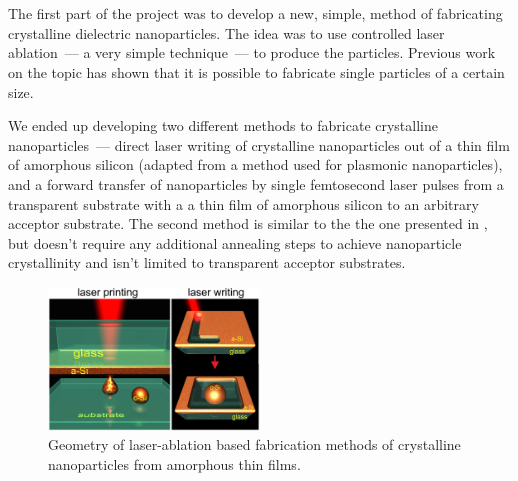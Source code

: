 \section{}
\label{sec:Ablation}
        The first part of the project was to develop a new, simple, method of fabricating crystalline dielectric
    nanoparticles. The idea was to use controlled laser ablation~--- a very simple technique~--- to produce the particles.
    Previous work on the topic\cite{kuznetsov2012magnetic, zywietz2014laser} has shown that it is possible to fabricate single particles
    of a certain size.

        We ended up developing two different methods to fabricate crystalline nanoparticles~--- direct laser writing of crystalline
    nanoparticles out of a thin film of amorphous silicon (adapted from a method used for plasmonic nanoparticles\cite{makarov2016controllable,
    dmitriev2016direct}), and a forward transfer of nanoparticles by single femtosecond laser pulses
    from a transparent substrate with a a thin film of amorphous silicon to an arbitrary acceptor substrate. The second method is
    similar to the the one presented in \cite{zywietz2014laser}, but doesn't require any additional annealing steps to achieve
    nanoparticle crystallinity and isn't limited to transparent acceptor substrates.

    \begin{figure}[h!]
            \begin{center}
                \includegraphics[width=0.5\textwidth]{figs/methods/LaserPrinting.eps}
            \end{center}
            \caption{Geometry of laser-ablation based fabrication methods of crystalline nanoparticles from amorphous
                        thin films.}
            \label{fig:LaserPrinting}
    \end{figure}

